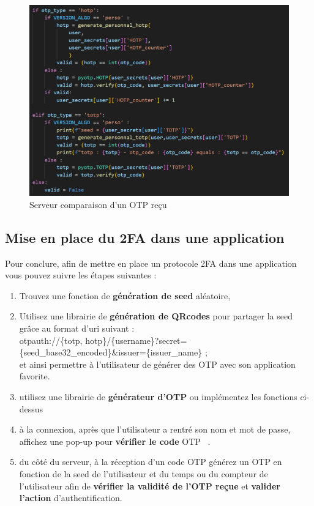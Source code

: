\documentclass[a4paper, 10pt]{article}
\newcommand{\otp}{\textsc{OTP} }
\begin{document}
\begin{figure}[H]
        \centering
        \includegraphics[scale=0.7]{img/C_proto/code/code_val_otp.png}
        \caption{Serveur comparaison d'un \otp reçu}
        \label{fig:code-val}
\end{figure}


    
    \subsection{Mise en place du 2FA dans une application}

    Pour conclure, afin de \textcolor{myblue}{mettre en place un protocole 2FA} dans une application vous pouvez suivre les étapes suivantes :
\begin{enumerate}
    \item Trouvez une fonction de \textbf{génération de seed} aléatoire,
    \item Utilisez une librairie de \textbf{génération de QRcodes} pour partager la seed grâce au format d'uri suivant : \\
            \textcolor{mygreen}{otpauth://\{totp, hotp\}/\{username\}?secret=\{seed\_base32\_encoded\}\&issuer=\{issuer\_name\}} ;\\
            et ainsi permettre à l'utilisateur de générer des \otp avec son application favorite.
    \item utilisez une librairie de \textbf{générateur d'\otp} ou implémentez les fonctions ci-dessus
    \item à la connexion, après que l'utilisateur a rentré son nom et mot de passe, affichez une pop-up pour \textbf{vérifier le code} \otp\ .
    \item du côté du serveur, à la réception d'un code \otp générez un \otp en fonction de la seed de l'utilisateur et du temps ou du compteur de l'utilisateur afin de \textbf{vérifier la validité de l'\otp reçue} et \textbf{valider l'action} d'authentification.
\end{enumerate}
\end{document}
